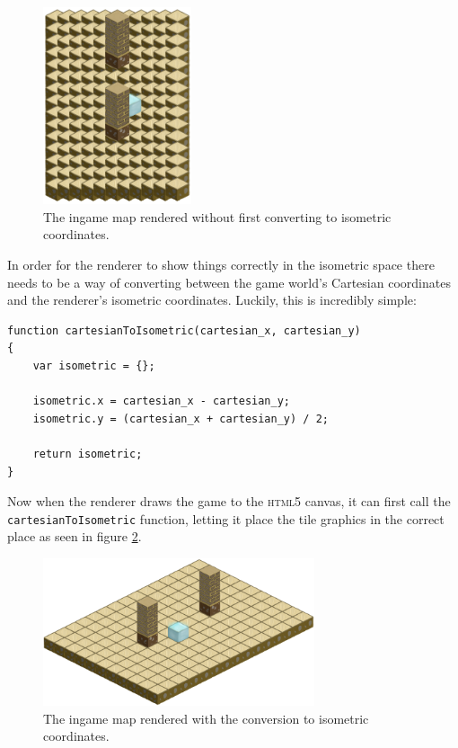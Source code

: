 \begin{figure}[H]
    \centering
    \includegraphics[height=5.8cm]{Images/map_without_iso_coords.png}
    \caption{The ingame map rendered without first converting to isometric coordinates.}
    \label{fig:map_without_iso_coords}
\end{figure}


In order for the renderer to show things correctly in the isometric space there needs to be a way of converting between the game world's Cartesian coordinates and the renderer's isometric coordinates. Luckily, this is incredibly simple:

\noindent
\begin{minipage}{\linewidth}
\begin{lstlisting}[style=js, caption={JavaScript implementation of a function to turn Cartesian coordinates into game isometric coordinates. Original algorithm from \cite{citeulike:13155325}.}, label=cartesian_to_isometric]
function cartesianToIsometric(cartesian_x, cartesian_y)
{
	var isometric = {};

    isometric.x = cartesian_x - cartesian_y;
    isometric.y = (cartesian_x + cartesian_y) / 2;

    return isometric;
}
\end{lstlisting}
\end{minipage}

Now when the renderer draws the game to the \textsc{html5} canvas, it can first call the \texttt{cartesianToIsometric} function, letting it place the tile graphics in the correct place as seen in figure \ref{fig:map_with_iso_coords}.

\begin{figure}
    \centering
    \includegraphics[width=8cm]{Images/map_with_iso_coords.png}
    \caption{The ingame map rendered with the conversion to isometric coordinates.}
    \label{fig:map_with_iso_coords}
\end{figure}

